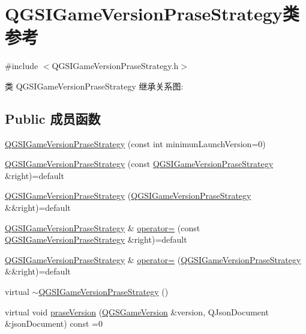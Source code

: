 \hypertarget{class_q_g_s_i_game_version_prase_strategy}{}\section{Q\+G\+S\+I\+Game\+Version\+Prase\+Strategy类 参考}
\label{class_q_g_s_i_game_version_prase_strategy}


{\ttfamily \#include $<$Q\+G\+S\+I\+Game\+Version\+Prase\+Strategy.\+h$>$}



类 Q\+G\+S\+I\+Game\+Version\+Prase\+Strategy 继承关系图\+:
\subsection*{Public 成员函数}
\begin{DoxyCompactItemize}
\item 
\mbox{\hyperlink{class_q_g_s_i_game_version_prase_strategy_a3c29364935ba148c690ccd486e082ac3}{Q\+G\+S\+I\+Game\+Version\+Prase\+Strategy}} (const int minimun\+Launch\+Version=0)
\item 
\mbox{\hyperlink{class_q_g_s_i_game_version_prase_strategy_a423186451d2d55ad4188f93a03637c52}{Q\+G\+S\+I\+Game\+Version\+Prase\+Strategy}} (const \mbox{\hyperlink{class_q_g_s_i_game_version_prase_strategy}{Q\+G\+S\+I\+Game\+Version\+Prase\+Strategy}} \&right)=default
\item 
\mbox{\hyperlink{class_q_g_s_i_game_version_prase_strategy_acb0f00faf8c5f4bb38b908d2716a4b1c}{Q\+G\+S\+I\+Game\+Version\+Prase\+Strategy}} (\mbox{\hyperlink{class_q_g_s_i_game_version_prase_strategy}{Q\+G\+S\+I\+Game\+Version\+Prase\+Strategy}} \&\&right)=default
\item 
\mbox{\hyperlink{class_q_g_s_i_game_version_prase_strategy}{Q\+G\+S\+I\+Game\+Version\+Prase\+Strategy}} \& \mbox{\hyperlink{class_q_g_s_i_game_version_prase_strategy_ad974d7f47d06b45c6350a86f6a3ce8d8}{operator=}} (const \mbox{\hyperlink{class_q_g_s_i_game_version_prase_strategy}{Q\+G\+S\+I\+Game\+Version\+Prase\+Strategy}} \&right)=default
\item 
\mbox{\hyperlink{class_q_g_s_i_game_version_prase_strategy}{Q\+G\+S\+I\+Game\+Version\+Prase\+Strategy}} \& \mbox{\hyperlink{class_q_g_s_i_game_version_prase_strategy_a5e0fdb61e7098cff6f92eb7b2da9f9a9}{operator=}} (\mbox{\hyperlink{class_q_g_s_i_game_version_prase_strategy}{Q\+G\+S\+I\+Game\+Version\+Prase\+Strategy}} \&\&right)=default
\item 
virtual \mbox{\hyperlink{class_q_g_s_i_game_version_prase_strategy_a9ab4fcfe48d46267fa62553e4840eb19}{$\sim$\+Q\+G\+S\+I\+Game\+Version\+Prase\+Strategy}} ()
\item 
virtual void \mbox{\hyperlink{class_q_g_s_i_game_version_prase_strategy_a6670763377fd8f61b9f84198b432dbf5}{prase\+Version}} (\mbox{\hyperlink{class_q_g_s_game_version}{Q\+G\+S\+Game\+Version}} \&version, Q\+Json\+Document \&json\+Document) const =0
\end{DoxyCompactItemize}
